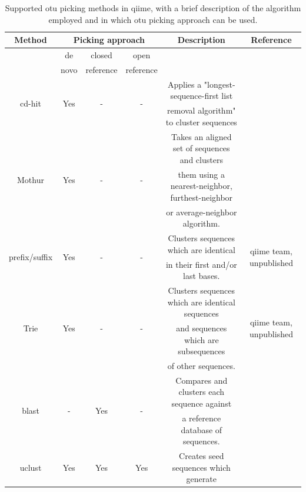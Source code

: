 \begin{table}[htbp]
\tiny
\centering
\caption[Supported \gls{otu} picking methods in \gls{qiime}, with a brief description of the algorithm employed and in which \gls{otu} picking approach can be used.]{Supported \gls{otu} picking methods in \gls{qiime}, with a brief description of the algorithm employed and in which \gls{otu} picking approach can be used.}\label{btable2}
\renewcommand{\arraystretch}{0.6}%
\begin{tabular*}{\textwidth}{cccccc}
\toprule
Method & \multicolumn{3}{c}{Picking approach} & Description & Reference \\
\midrule
& de & closed & open & & \\
& novo & reference & reference & & \\
\midrule
\multirow{2}{*}{cd-hit} & \multirow{2}{*}{Yes} & \multirow{2}{*}{-} & \multirow{2}{*}{-} & Applies a "longest-sequence-first list & \multirow{2}{*}{\cite{Li2006, Li2001}}\\
& & & & removal algorithm" to cluster sequences & \\
\midrule
\multirow{3}{*}{Mothur} & \multirow{3}{*}{Yes} & \multirow{3}{*}{-} & \multirow{3}{*}{-} & Takes an aligned set of sequences and clusters & \multirow{3}{*}{\cite{Schloss2009}}\\
& & & & them using a nearest-neighbor, furthest-neighbor & \\
& & & & or average-neighbor algorithm. & \\
\midrule
\multirow{2}{*}{prefix/suffix} & \multirow{2}{*}{Yes} & \multirow{2}{*}{-} & \multirow{2}{*}{-} & Clusters sequences which are identical & \multirow{2}{*}{\gls{qiime} team, unpublished}\\
& & & & in their first and/or last bases. & \\
\midrule
\multirow{3}{*}{Trie} & \multirow{3}{*}{Yes} & \multirow{3}{*}{-} & \multirow{3}{*}{-} & Clusters sequences which are identical sequences & \multirow{3}{*}{\gls{qiime} team, unpublished}\\
& & & & and sequences which are subsequences & \\
& & & & of other sequences. & \\
\midrule
\multirow{2}{*}{blast} & \multirow{2}{*}{-} & \multirow{2}{*}{Yes} & \multirow{2}{*}{-} & Compares and clusters each sequence against & \multirow{2}{*}{\cite{Altschul1990}}\\
& & & & a reference database of sequences. & \\
\midrule
\multirow{2}{*}{uclust} & \multirow{2}{*}{Yes} & \multirow{2}{*}{Yes} & \multirow{2}{*}{Yes} & Creates seed sequences which generate & \multirow{2}{*}{\cite{Edgar2010}}\\

\end{tabular*}
\end{table}
